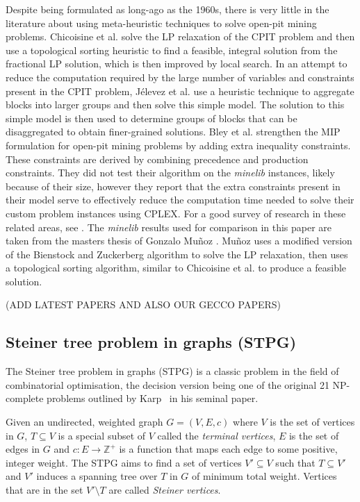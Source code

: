 \documentclass[journal]{IEEEtran}
\begin{document}

Despite being formulated as long-ago as the 1960s, there is very little in the literature about using meta-heuristic techniques to solve open-pit mining problems. Chicoisine et al. \cite{cpit} solve the LP relaxation of the CPIT problem and then use a topological sorting heuristic to find a feasible, integral solution from the fractional LP solution, which is then improved by local search.
%
In an attempt to reduce the computation required by the large number of variables and constraints present in the CPIT problem, J\'elevez et al. \cite{aggregate} use a heuristic technique to aggregate blocks into larger groups and then solve this simple model. The solution to this simple model is then used to determine groups of blocks that can be disaggregated to obtain finer-grained solutions.
%
Bley et al. strengthen the MIP formulation for open-pit mining problems by adding extra inequality constraints. These constraints are derived by combining precedence and production constraints. They did not test their algorithm on the \emph{minelib} instances, likely because of their size, however they report that the extra constraints present in their model serve to effectively reduce the computation time needed to solve their custom problem instances using CPLEX. For a good survey of research in these related areas, see \cite{hochbaum,meagher}.
%
The \emph{minelib} results used for comparison in this paper are taken from the masters thesis of Gonzalo Mu\~noz \cite{toposort}. Mu\~noz uses a modified version of the Bienstock and Zuckerberg algorithm \cite{bz} to solve the LP relaxation, then uses a topological sorting algorithm, similar to Chicoisine et al. to produce a feasible solution.

(ADD LATEST PAPERS AND ALSO OUR GECCO PAPERS)


\subsection{Steiner tree problem in graphs (STPG)}

The Steiner tree problem in graphs (STPG) is a classic problem in the field of combinatorial optimisation, the decision version being one of the original 21 NP-complete problems outlined by Karp~\cite{np:karp} in his seminal paper.

Given an undirected, weighted graph $G = (V,E,c)$ where $V$ is the set of vertices in $G$, $T \subseteq V$ is a special subset of $V$ called the \emph{terminal vertices}, $E$ is the set of edges in $G$ and $c : E \to \mathbb{Z^+}$ is a function that maps each edge to some positive, integer weight. The STPG aims to find a set of vertices $V' \subseteq V$ such that $T \subseteq V'$ and $V'$ induces a spanning tree over $T$ in $G$ of minimum total weight. Vertices that are in the set $V' \setminus T$ are called \emph{Steiner vertices}.
\end{document}
